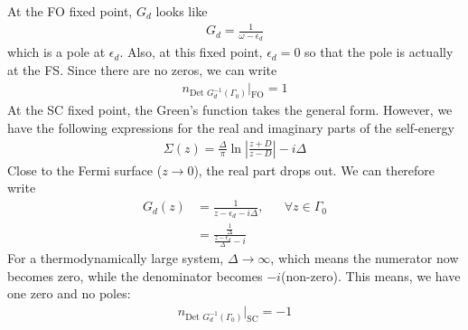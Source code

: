 \documentclass[12pt,twoside]{article}
\numberwithin{equation}{section}
\begin{document}
{	At the FO fixed point, \(G_d\) looks like
\begin{equation}\begin{aligned}
	G_d = \frac{1}{\omega - \epsilon_d}
\end{aligned}\end{equation}
which is a pole at \(\epsilon_d\). Also, at this fixed point, \(\epsilon_d=0\) so that the pole is actually at the FS. Since there are no zeros, we can write
\begin{equation}\begin{aligned}
	n_{\text{Det }G_d^{-1}(\Gamma_0)}\vert_\text{FO} = 1
\end{aligned}\end{equation}
At the SC fixed point, the Green's function takes the general form. However, we have the following expressions for the real and imaginary parts of the self-energy
\begin{equation}\begin{aligned}
\Sigma(z) = \frac{\Delta}{\pi}\ln \left| \frac{z + D}{z - D} \right| - i\Delta
\end{aligned}\end{equation}
Close to the Fermi surface (\(z \to 0\)), the real part drops out. We can therefore write
\begin{equation}\begin{aligned}
	G_d(z) &= \frac{1}{z - \epsilon_d - i\Delta}, &&\forall z \in \Gamma_0\\
	       &=\frac{\frac{1}{\Delta}}{ \frac{z - \epsilon_d}{\Delta} - i}
\end{aligned}\end{equation}
For a thermodynamically large system, \(\Delta \to \infty\), which means the numerator now becomes zero, while the denominator becomes \(-i\)(non-zero). This means, we have one zero and no poles:
\begin{equation}\begin{aligned}
	n_{\text{Det }G_d^{-1}(\Gamma_0)}\vert_\text{SC} = -1
\end{aligned}\end{equation}
}
\end{document}
